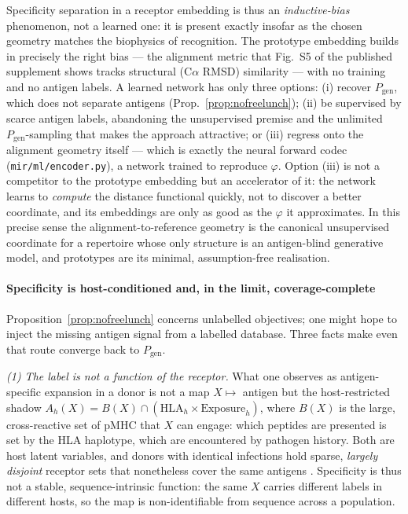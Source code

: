 \documentclass[11pt]{article}
\theoremstyle{oldplain}
\theoremstyle{oldrem}
\newcommand{\Pgen}{P_{\mathrm{gen}}}
\newcommand{\code}[1]{\texttt{#1}}
\begin{document}
Specificity separation in a receptor embedding is thus an \emph{inductive-bias} phenomenon, not a learned
one: it is present exactly insofar as the chosen geometry matches the biophysics of recognition. The
prototype embedding builds in precisely the right bias --- the alignment metric that Fig.~S5 of the
published supplement \cite{Kremlyakova2025}
shows tracks structural (C$\alpha$ {\scshape RMSD}) similarity --- with no training and no antigen labels. A
learned network has only three options: (i) recover $\Pgen$, which does not separate antigens
(Prop.~\ref{prop:nofreelunch}); (ii) be supervised by scarce antigen labels, abandoning the unsupervised
premise and the unlimited $\Pgen$-sampling that makes the approach attractive; or (iii) regress onto the
alignment geometry itself --- which is exactly the neural forward codec (\code{mir/ml/encoder.py}), a network
trained to reproduce $\varphi$. Option (iii) is not a competitor to the prototype embedding but an
accelerator of it: the network learns to \emph{compute} the distance functional quickly, not to discover a
better coordinate, and its embeddings are only as good as the $\varphi$ it approximates. In this precise
sense the alignment-to-reference geometry is the canonical unsupervised coordinate for a repertoire whose
only structure is an antigen-blind generative model, and prototypes are its minimal, assumption-free
realisation.

\paragraph{Specificity is host-conditioned and, in the limit, coverage-complete} Proposition~\ref{prop:nofreelunch}
concerns unlabelled objectives; one might hope to inject the missing antigen signal from a labelled
database. Three facts make even that route converge back to $\Pgen$.

\emph{(1) The label is not a function of the receptor.} What one observes as antigen-specific expansion in a
donor is not a map $X\mapsto$ antigen but the host-restricted shadow $A_h(X)=B(X)\cap(\mathrm{HLA}_h\times
\mathrm{Exposure}_h)$, where $B(X)$ is the large, cross-reactive set of pMHC that $X$ can engage: which
peptides are presented is set by the {\scshape HLA} haplotype, which are encountered by pathogen history.
Both are host latent variables, and donors with identical infections hold sparse, \emph{largely disjoint}
receptor sets that nonetheless cover the same antigens \cite{Mayer2015}. Specificity is thus not a stable,
sequence-intrinsic function: the same $X$ carries different labels in different hosts, so the map is
non-identifiable from sequence across a population.
\end{document}
